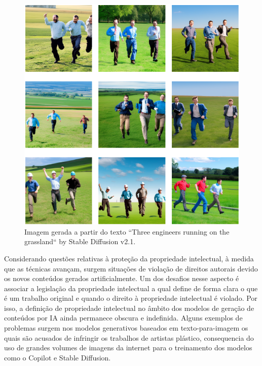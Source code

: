 \begin{figure}
  \centering 
  \includegraphics[scale=0.47]{images_generated_with_text_three_engineers.png}
  \caption{Imagem gerada a partir do texto ``Three engineers running on the grassland``  by Stable Diffusion v2.1.}
  \label{fig:images_of_three_engineers}
\end{figure}



Considerando questões relativas à proteção da propriedade intelectual, 
à medida que as técnicas avançam, surgem situações de violação de direitos autorais
devido os novos conteúdos gerados artificialmente. Um dos desafios nesse aspecto 
é associar a legislação da propriedade intelectual a qual define de forma clara o que é um trabalho original 
e quando o direito à propriedade intelectual é violado. Por isso, a definição de propriedade intelectual no âmbito 
dos modelos de geração de conteúdos por IA ainda permanece obscura e indefinida.
Alguns exemplos de problemas surgem nos modelos generativos 
baseados em texto-para-imagem os quais são acusados de infringir os trabalhos de artistas plástico, 
consequencia do uso de grandes volumes de imagens da internet para o treinamento dos modelos como o Copilot e Stable Diffusion.

